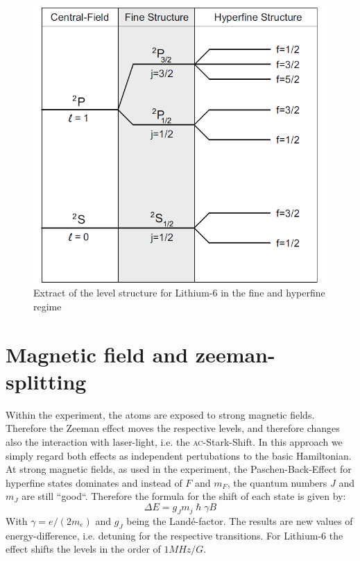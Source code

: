 \begin{figure}[H]

\begin{center}
\includegraphics[scale=.5] {levels1}
\end{center}
\caption{Extract of the level structure for Lithium-6 in the fine and hyperfine regime \cite{gehm}}
\label{levels1}
\end{figure}

\section{Magnetic field and zeeman-splitting}

Within the experiment, the atoms are exposed to strong magnetic fields. Therefore the Zeeman effect moves the respective levels, and therefore changes also the interaction with laser-light, i.e. the \textsc{ac}-Stark-Shift. In this approach we simply regard both effects as independent pertubations to the basic Hamiltonian. At strong magnetic fields, as used in the experiment, the Paschen-Back-Effect for hyperfine states dominates and instead of $F$ and $m_F$, the quantum numbers $J$ and $m_J$ are still “good“. Therefore the formula for the shift of each state is given by:
\begin{equation}
\Delta E=g_Jm_j\hslash\gamma B
\end{equation}
With $\gamma=e/(2m_e)$ and $g_J$ being the Landé-factor. The results are new values of energy-difference, i.e. detuning for the respective transitions. For Lithium-6 the effect shifts the levels in the order of $1\unit{MHz/G}$.

